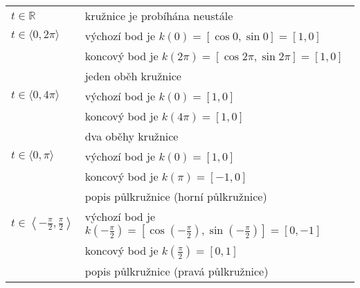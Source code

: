 \begin{tabular}{ll}
	$t \in \mathbb{R}$             & kružnice je probíhána neustále                                                                                       \\  
	$t \in \langle 0, 2\pi\rangle$ & výchozí bod je $k(0)=[\cos{0}, \sin{0}] = [1, 0]$                                                                      \\ 
	                               & koncový bod je $k\left(2\pi\right)=[\cos{2\pi}, \sin{2\pi}] = [1, 0]$                                                   \\ 
	                               & jeden oběh kružnice                                                                                                    \\ 
	$t \in \langle 0, 4\pi\rangle$ & výchozí bod je $k(0) = [1, 0]$                                                                                         \\ 
	                               & koncový bod je $k\left(4\pi\right) = [1, 0]$                                                                            \\ 
	                               & dva oběhy kružnice                                                                                                     \\ 
	$t \in \langle 0, \pi\rangle$  & výchozí bod je $k(0) = [1, 0]$                                                                                         \\ 
	                               & koncový bod je $k\left(\pi\right)=[-1, 0]$                                                                              \\ 
	                               & popis půlkružnice (horní půlkružnice)                                                                               \\ 
	$t \in \left\langle -\frac{\pi}{2}, \frac{\pi}{2}\right\rangle$
	                               & výchozí bod je $k\left(-\frac{\pi}{2}\right) = \left[\cos{(-\frac{\pi}{2})}, \sin{(-\frac{\pi}{2})}\right]  = [0, -1]$ \\ 
	                               & koncový bod je $k\left(\frac{\pi}{2}\right) = [0, 1]$                                                                   \\ 
	                               & popis půlkružnice (pravá půlkružnice)                                                                               \\ 

\end{tabular}
